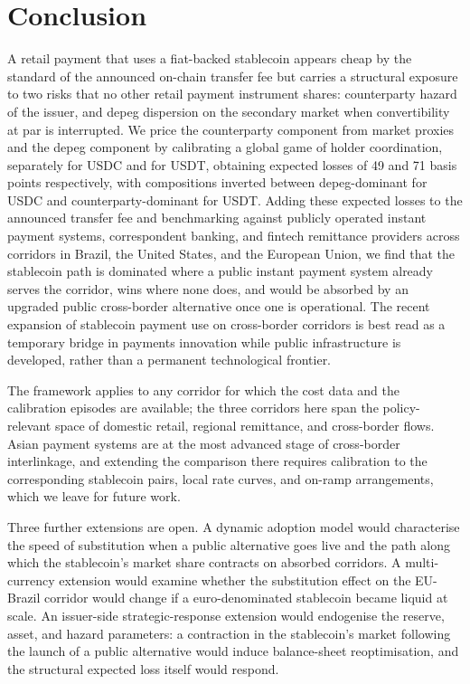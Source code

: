 \section{Conclusion}\label{sec:conclusion}

A retail payment that uses a fiat-backed stablecoin appears cheap by the standard of the announced on-chain transfer fee but carries a structural exposure to two risks that no other retail payment instrument shares: counterparty hazard of the issuer, and depeg dispersion on the secondary market when convertibility at par is interrupted. We price the counterparty component from market proxies and the depeg component by calibrating a global game of holder coordination, separately for USDC and for USDT, obtaining expected losses of 49 and 71 basis points respectively, with compositions inverted between depeg-dominant for USDC and counterparty-dominant for USDT. Adding these expected losses to the announced transfer fee and benchmarking against publicly operated instant payment systems, correspondent banking, and fintech remittance providers across corridors in Brazil, the United States, and the European Union, we find that the stablecoin path is dominated where a public instant payment system already serves the corridor, wins where none does, and would be absorbed by an upgraded public cross-border alternative once one is operational. The recent expansion of stablecoin payment use on cross-border corridors is best read as a temporary bridge in payments innovation while public infrastructure is developed, rather than a permanent technological frontier.

The framework applies to any corridor for which the cost data and the calibration episodes are available; the three corridors here span the policy-relevant space of domestic retail, regional remittance, and cross-border flows. Asian payment systems are at the most advanced stage of cross-border interlinkage, and extending the comparison there requires calibration to the corresponding stablecoin pairs, local rate curves, and on-ramp arrangements, which we leave for future work.

Three further extensions are open. A dynamic adoption model would characterise the speed of substitution when a public alternative goes live and the path along which the stablecoin's market share contracts on absorbed corridors. A multi-currency extension would examine whether the substitution effect on the EU-Brazil corridor would change if a euro-denominated stablecoin became liquid at scale. An issuer-side strategic-response extension would endogenise the reserve, asset, and hazard parameters: a contraction in the stablecoin's market following the launch of a public alternative would induce balance-sheet reoptimisation, and the structural expected loss itself would respond.

